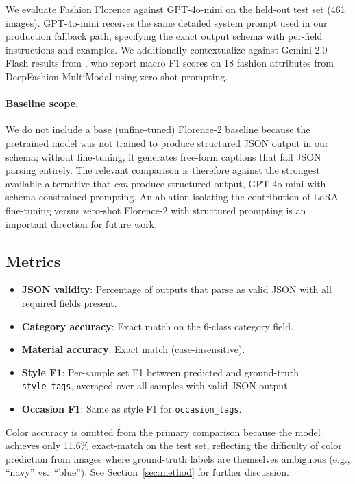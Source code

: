 \documentclass[10pt,twocolumn]{article}
\begin{document}
We evaluate Fashion Florence against GPT-4o-mini on the held-out test set
(461 images).  GPT-4o-mini receives the same detailed system prompt used in
our production fallback path, specifying the exact output schema with
per-field instructions and examples.  We additionally contextualize against
Gemini 2.0 Flash results from \citet{kumar2025fashion}, who report macro F1
scores on 18 fashion attributes from DeepFashion-MultiModal using zero-shot
prompting.

\paragraph{Baseline scope.}
We do not include a base (unfine-tuned) Florence-2 baseline because the
pretrained model was not trained to produce structured JSON output in our
schema; without fine-tuning, it generates free-form captions that fail JSON
parsing entirely.  The relevant comparison is therefore against the strongest
available alternative that \emph{can} produce structured output, GPT-4o-mini
with schema-constrained prompting.  An ablation isolating the contribution
of LoRA fine-tuning versus zero-shot Florence-2 with structured prompting is
an important direction for future work.

\subsection{Metrics}

\begin{itemize}[leftmargin=*,topsep=2pt,itemsep=1pt]
\item \textbf{JSON validity}: Percentage of outputs that parse as valid JSON
  with all required fields present.
\item \textbf{Category accuracy}: Exact match on the 6-class category field.
\item \textbf{Material accuracy}: Exact match (case-insensitive).
\item \textbf{Style F1}: Per-sample set F1 between predicted and ground-truth
  \texttt{style\_tags}, averaged over all samples with valid JSON output.
\item \textbf{Occasion F1}: Same as style F1 for \texttt{occasion\_tags}.
\end{itemize}

\noindent Color accuracy is omitted from the primary comparison because
the model achieves only 11.6\% exact-match on the test set, reflecting the
difficulty of color prediction from images where ground-truth labels are
themselves ambiguous (e.g., ``navy'' vs.\ ``blue'').  See
Section~\ref{sec:method} for further discussion.
\end{document}
